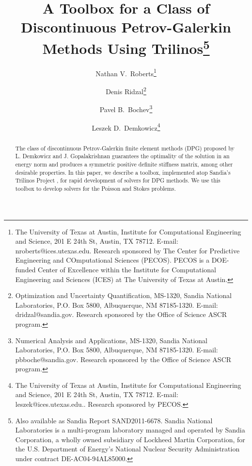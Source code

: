 \documentclass{siamltex}
\title{A Toolbox for a Class of Discontinuous
       Petrov-Galerkin Methods Using Trilinos\thanks{Also available as Sandia Report SAND2011-6678.
                 Sandia National Laboratories is a multi-program laboratory
                 managed and operated by Sandia Corporation, a wholly owned subsidiary of
                 Lockheed Martin Corporation, for the U.S. Department of
                 Energy's National Nuclear Security Administration under
                 contract DE-AC04-94AL85000.}}
\author{
Nathan V.\ Roberts\thanks{The University of Texas at Austin,
Institute for Computational Engineering and Science,
201 E 24th St,
Austin, TX 78712. E-mail: nroberts@ices.utexas.edu.  Research sponsored by The Center for Predictive Engineering and COmputational Sciences (PECOS). PECOS is a DOE-funded Center of Excellence within the Institute for Computational Engineering and Sciences (ICES) at The University of Texas at Austin.}
\and
Denis Ridzal\thanks{Optimization and Uncertainty Quantification, MS-1320,
                 Sandia National Laboratories, P.O. Box 5800,
                 Albuquerque, NM 87185-1320.  E-mail: dridzal@sandia.gov.
                 Research sponsored by the Office of Science ASCR program.}
\and
Pavel B.\ Bochev\thanks{Numerical Analysis and Applications, MS-1320,
                 Sandia National Laboratories, P.O. Box 5800,
                 Albuquerque, NM 87185-1320.  E-mail: pbboche@sandia.gov.
                 Research sponsored by the Office of Science ASCR program.}
\and
Leszek D.\ Demkowicz\thanks{The University of Texas at Austin,
Institute for Computational Engineering and Science,
201 E 24th St,
Austin, TX 78712. E-mail: leszek@ices.utexas.edu.. Research sponsored by PECOS.}  }
\begin{document}
\maketitle

\begin{abstract}
The class of discontinuous Petrov-Galerkin finite element methods (DPG) proposed by L. Demkowicz and J. Gopalakrishnan \cite{DPG1,DPG2} guarantees the optimality of the solution in an energy norm and produces a symmetric positive definite stiffness matrix, among other desirable properties.  In this paper, we describe a toolbox, implemented atop Sandia's Trilinos Project \cite{Trilinos}, for rapid development of solvers for DPG methods.  We use this toolbox to develop solvers for the Poisson and Stokes problems.
\end{abstract}


\end{document}
